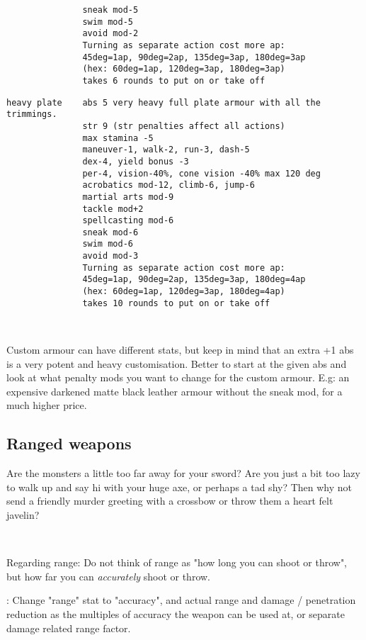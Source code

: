 \begin{samepage}
\begin{verbatim}
               sneak mod-5
               swim mod-5
               avoid mod-2
               Turning as separate action cost more ap:
               45deg=1ap, 90deg=2ap, 135deg=3ap, 180deg=3ap
               (hex: 60deg=1ap, 120deg=3ap, 180deg=3ap)
               takes 6 rounds to put on or take off
\end{verbatim} \blocklistgap \begin{verbatim}
heavy plate    abs 5 very heavy full plate armour with all the trimmings.
               str 9 (str penalties affect all actions)
               max stamina -5
               maneuver-1, walk-2, run-3, dash-5
               dex-4, yield bonus -3
               per-4, vision-40%, cone vision -40% max 120 deg
               acrobatics mod-12, climb-6, jump-6
               martial arts mod-9
               tackle mod+2
               spellcasting mod-6
               sneak mod-6
               swim mod-6
               avoid mod-3
               Turning as separate action cost more ap:
               45deg=1ap, 90deg=2ap, 135deg=3ap, 180deg=4ap
               (hex: 60deg=1ap, 120deg=3ap, 180deg=4ap)
               takes 10 rounds to put on or take off
\end{verbatim} \end{samepage} \normalsize \goodbreak

\

Custom armour can have different stats, but keep in mind that an extra +1 abs is a very potent and heavy customisation. Better to start at the given abs and look at what penalty mods you want to change for the custom armour. E.g: an expensive darkened matte black leather armour without the sneak mod, for a much higher price.


\subsection*{Ranged weapons}
Are the monsters a little too far away for your sword? Are you just a bit too lazy to walk up and say hi with your huge axe, or perhaps a tad shy? Then why not send a friendly murder greeting with a crossbow or throw them a heart felt javelin?

\

Regarding range: Do not think of range as "how long you can shoot or throw", but how far you can \emph{accurately} shoot or throw.

\todo: Change "range" stat to "accuracy", and actual range and damage / penetration reduction as the multiples of accuracy the weapon can be used at, or separate damage related range factor.

